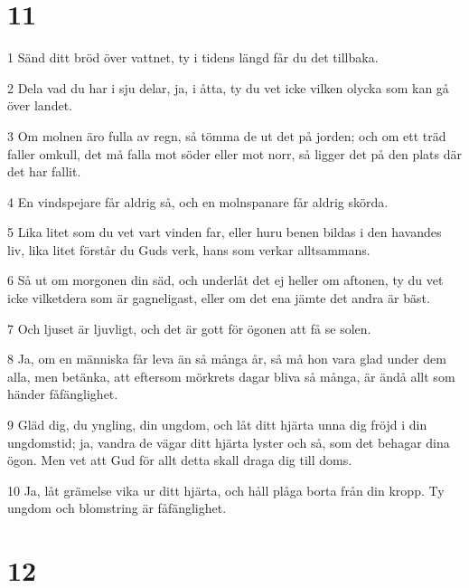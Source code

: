 \chapter{11}

\par 1 Sänd ditt bröd över vattnet, ty i tidens längd får du det tillbaka.
\par 2 Dela vad du har i sju delar, ja, i åtta, ty du vet icke vilken olycka som kan gå över landet.
\par 3 Om molnen äro fulla av regn, så tömma de ut det på jorden; och om ett träd faller omkull, det må falla mot söder eller mot norr, så ligger det på den plats där det har fallit.
\par 4 En vindspejare får aldrig så, och en molnspanare får aldrig skörda.
\par 5 Lika litet som du vet vart vinden far, eller huru benen bildas i den havandes liv, lika litet förstår du Guds verk, hans som verkar alltsammans.
\par 6 Så ut om morgonen din säd, och underlåt det ej heller om aftonen, ty du vet icke vilketdera som är gagneligast, eller om det ena jämte det andra är bäst.
\par 7 Och ljuset är ljuvligt, och det är gott för ögonen att få se solen.
\par 8 Ja, om en människa får leva än så många år, så må hon vara glad under dem alla, men betänka, att eftersom mörkrets dagar bliva så många, är ändå allt som händer fåfänglighet.
\par 9 Gläd dig, du yngling, din ungdom, och låt ditt hjärta unna dig fröjd i din ungdomstid; ja, vandra de vägar ditt hjärta lyster och så, som det behagar dina ögon. Men vet att Gud för allt detta skall draga dig till doms.
\par 10 Ja, låt grämelse vika ur ditt hjärta, och håll plåga borta från din kropp. Ty ungdom och blomstring är fåfänglighet.

\chapter{12}

